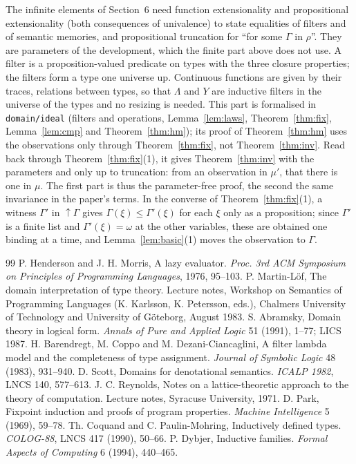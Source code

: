 \documentclass[11pt]{amsart}
\theoremstyle{definition}
\theoremstyle{remark}
\newcommand{\up}{{\uparrow}}
\begin{document}
The infinite elements of Section~6 need function extensionality and
propositional extensionality (both consequences of univalence) to state
equalities of filters and of semantic memories, and propositional
truncation for ``for some $\Gamma$ in $\rho$''. They are parameters of the
development, which the finite part above does not use. A filter is a
proposition-valued predicate on types with the three closure properties;
the filters form a type one universe up. Continuous functions are given by
their traces, relations between types, so that $\Lambda$ and $Y$ are
inductive filters in the universe of the types and no resizing is needed.
This part is formalised in \texttt{domain/ideal} (filters and operations,
Lemma~\ref{lem:laws}, Theorem~\ref{thm:fix}, Lemma~\ref{lem:cmp} and
Theorem~\ref{thm:hm}); its proof of Theorem~\ref{thm:hm} uses the
observations only through Theorem~\ref{thm:fix}, not
Theorem~\ref{thm:inv}. Read back through Theorem~\ref{thm:fix}(1), it gives
Theorem~\ref{thm:inv} with the parameters and only up to truncation: from an
observation in $\mu'$, that there is one in $\mu$. The first part is thus the
parameter-free proof, the second the same invariance in the paper's terms. In the converse of Theorem~\ref{thm:fix}(1), a
witness $\Gamma'$ in $\up\Gamma$ gives $\Gamma(\xi)\le\Gamma'(\xi)$ for each
$\xi$ only as a proposition; since $\Gamma'$ is a finite list and
$\Gamma'(\xi)=\omega$ at the other variables, these are obtained one binding
at a time, and Lemma~\ref{lem:basic}(1) moves the observation to $\Gamma$.

\begin{thebibliography}{99}
 P. Henderson and J. H. Morris, A lazy evaluator.
\emph{Proc. 3rd ACM Symposium on Principles of Programming Languages}, 1976, 95--103.
 P. Martin-L\"of, The domain interpretation of type theory.
Lecture notes, Workshop on Semantics of Programming Languages (K. Karlsson,
K. Petersson, eds.), Chalmers University of Technology and University of
G\"oteborg, August 1983.
 S. Abramsky, Domain theory in logical form.
\emph{Annals of Pure and Applied Logic} 51 (1991), 1--77; LICS 1987.
 H. Barendregt, M. Coppo and M. Dezani-Ciancaglini, A filter
lambda model and the completeness of type assignment.
\emph{Journal of Symbolic Logic} 48 (1983), 931--940.
 D. Scott, Domains for denotational semantics.
\emph{ICALP 1982}, LNCS 140, 577--613.
 J. C. Reynolds, Notes on a lattice-theoretic approach to the
theory of computation. Lecture notes, Syracuse University, 1971.
 D. Park, Fixpoint induction and proofs of program properties.
\emph{Machine Intelligence} 5 (1969), 59--78.
 Th. Coquand and C. Paulin-Mohring, Inductively defined types.
\emph{COLOG-88}, LNCS 417 (1990), 50--66.
 P. Dybjer, Inductive families.
\emph{Formal Aspects of Computing} 6 (1994), 440--465.
\end{thebibliography}
\end{document}
